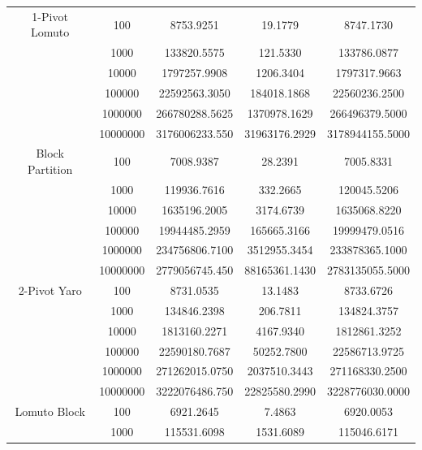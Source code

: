 \documentclass[a4paper,oneside,12pt]{book}
\begin{document}
\begin{center}
    \small
    \begin{tabular}{ |c c | c c c| }
        \hline
        1-Pivot Lomuto  & 100      & 8753.9251      & 19.1779       & 8747.1730 \\
                        & 1000     & 133820.5575    & 121.5330      & 133786.0877 \\
                        & 10000    & 1797257.9908   & 1206.3404     & 1797317.9663 \\
                        & 100000   & 22592563.3050  & 184018.1868   & 22560236.2500 \\
                        & 1000000  & 266780288.5625 & 1370978.1629  & 266496379.5000 \\
                        & 10000000 & 3176006233.550 & 31963176.2929 & 3178944155.5000 \\
        Block Partition & 100      & 7008.9387      & 28.2391       & 7005.8331 \\
                        & 1000     & 119936.7616    & 332.2665      & 120045.5206 \\
                        & 10000    & 1635196.2005   & 3174.6739     & 1635068.8220 \\
                        & 100000   & 19944485.2959  & 165665.3166   & 19999479.0516 \\
                        & 1000000  & 234756806.7100 & 3512955.3454  & 233878365.1000 \\
                        & 10000000 & 2779056745.450 & 88165361.1430 & 2783135055.5000 \\
        \hline
        2-Pivot Yaro    & 100      & 8731.0535      & 13.1483       & 8733.6726 \\
                        & 1000     & 134846.2398    & 206.7811      & 134824.3757 \\
                        & 10000    & 1813160.2271   & 4167.9340     & 1812861.3252 \\
                        & 100000   & 22590180.7687  & 50252.7800    & 22586713.9725 \\
                        & 1000000  & 271262015.0750 & 2037510.3443  & 271168330.2500 \\
                        & 10000000 & 3222076486.750 & 22825580.2990 & 3228776030.0000 \\
        Lomuto Block    & 100      & 6921.2645      & 7.4863        & 6920.0053 \\
                        & 1000     & 115531.6098    & 1531.6089     & 115046.6171 \\

\end{tabular}
\end{center}
\end{document}
